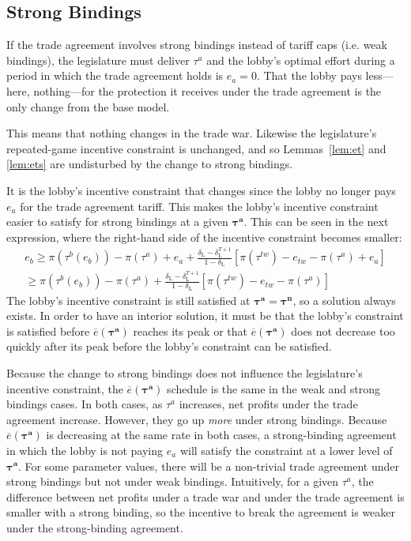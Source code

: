 \documentclass[authoryear, review]{elsarticle}
\newcommand{\ov}{\overline}
\newcommand{\bta}{\bm{\tau^a}}
\newcommand{\btn}{\bm{\tau^n}}
\newcommand{\de}{\delta}
\begin{document}
\subsection{Strong Bindings}
\label{sec:strong}
If the trade agreement involves strong bindings instead of tariff caps (i.e. weak bindings), the legislature must deliver $\tau^a$ and the lobby's optimal effort during a period in which the trade agreement holds is $e_a = 0$. That the lobby pays less---here, nothing---for the protection it receives under the trade agreement is the only change from the base model.

This means that nothing changes in the trade war. Likewise the legislature's repeated-game incentive constraint is unchanged, and so Lemmas~\ref{lem:et} and \ref{lem:ets} are undisturbed by the change to strong bindings.

It is the lobby's incentive constraint that changes since the lobby no longer pays $e_a$ for the trade agreement tariff. This makes the lobby's incentive constraint easier to satisfy for strong bindings at a given $\bta$. This can be seen in the next expression, where the right-hand side of the incentive constraint becomes smaller:
\begin{multline*}
	e_b \geq \pi(\tau^b(e_b)) - \pi(\tau^a) + e_a + \frac{\de_\text{L} - \de_\text{L}^{T+1}}{1-\de_\text{L}} \left[\pi(\tau^{tw}) -e_{tw} - \pi(\tau^a) + e_a\right] \\
		\geq \pi(\tau^b(e_b)) - \pi(\tau^a) + \frac{\de_\text{L} - \de_\text{L}^{T+1}}{1-\de_\text{L}} \left[\pi(\tau^{tw}) -e_{tw} - \pi(\tau^a) \right]
\end{multline*}
The lobby's incentive constraint is still satisfied at $\bta = \btn$, so a solution always exists. In order to have an interior solution, it must be that the lobby's constraint is satisfied before $\ov{e}(\bta)$ reaches its peak or that $\ov{e}(\bta)$ does not decrease too quickly after its peak before the lobby's constraint can be satisfied.

Because the change to strong bindings does not influence the legislature's incentive constraint, the $\ov{e}(\bta)$ schedule is the same in the weak and strong bindings cases. In both cases, as $\tau^a$ increases, net profits under the trade agreement increase. However, they go up \textit{more} under strong bindings. Because $\ov{e}(\bta)$ is decreasing at the same rate in both cases, a strong-binding agreement in which the lobby is not paying $e_a$ will satisfy the constraint at a lower level of $\bta$. For some parameter values, there will be a non-trivial trade agreement under strong bindings but not under weak bindings. Intuitively, for a given $\tau^a$, the difference between net profits under a trade war and under the trade agreement is smaller with a strong binding, so the incentive to break the agreement is weaker under the strong-binding agreement.
\end{document}
